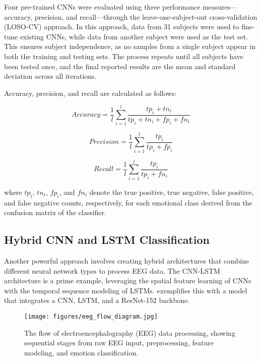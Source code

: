 \documentclass[conference]{IEEEtran}
\begin{document}
Four pre-trained CNNs were evaluated using three performance measures—accuracy, precision, and recall—through the leave-one-subject-out cross-validation (LOSO-CV) approach. In this approach, data from 31 subjects were used to fine-tune existing CNNs, while data from another subject were used as the test set. This ensures subject independence, as no samples from a single subject appear in both the training and testing sets. The process repeats until all subjects have been tested once, and the final reported results are the mean and standard deviation across all iterations.

Accuracy, precision, and recall are calculated as follows:

\begin{equation}
Accuracy = \frac{1}{l} \sum_{i=1}^{l} \frac{tp_i + tn_i}{tp_i + tn_i + fp_i + fn_i}
\end{equation}

\begin{equation}
Precision = \frac{1}{l} \sum_{i=1}^{l} \frac{tp_i}{tp_i + fp_i}
\end{equation}

\begin{equation}
Recall = \frac{1}{l} \sum_{i=1}^{l} \frac{tp_i}{tp_i + fn_i}
\end{equation}

where \(tp_i\), \(tn_i\), \(fp_i\), and \(fn_i\) denote the true positive, true negative, false positive, and false negative counts, respectively, for each emotional class derived from the confusion matrix of the classifier.


\subsection{Hybrid CNN and LSTM Classification}
Another powerful approach involves creating hybrid architectures that combine different neural network types to process EEG data. The CNN-LSTM architecture is a prime example, leveraging the spatial feature learning of CNNs with the temporal sequence modeling of LSTMs. \cite{b2} exemplifies this with a model that integrates a CNN, LSTM, and a ResNet-152 backbone.

\begin{figure}[H]
    \centering
    \texttt{[image: figures/eeg\_flow\_diagram.jpg]}
    \caption{The flow of electroencephalography (EEG) data processing, showing sequential stages from raw EEG input, preprocessing, feature modeling, and emotion classification.}
    \label{fig:eeg_flow}
\end{figure}
\end{document}
